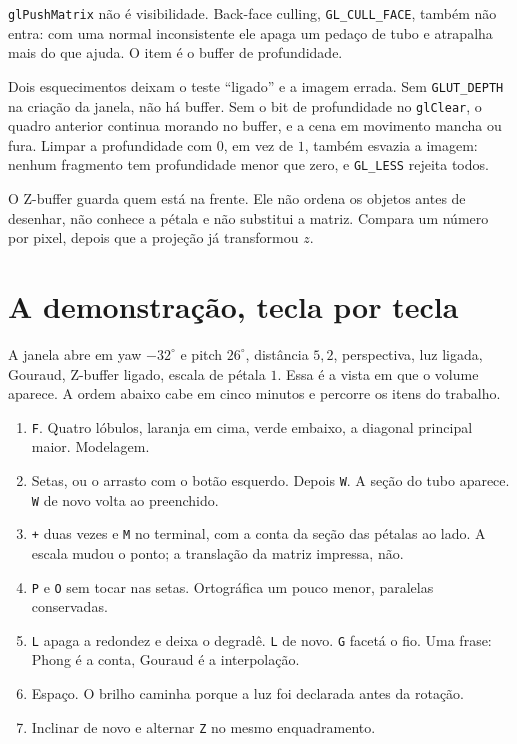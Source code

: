 \documentclass[11pt,a4paper]{article}
\newcommand{\fn}[1]{\texttt{\nobreak\hspace{0pt}#1}}
\begin{document}
\fn{glPushMatrix} não é visibilidade. Back-face culling, \fn{GL\_CULL\_FACE}, também não entra: com uma normal inconsistente ele apaga um pedaço de tubo e atrapalha mais do que ajuda. O item é o buffer de profundidade.

Dois esquecimentos deixam o teste ``ligado'' e a imagem errada. Sem \fn{GLUT\_DEPTH} na criação da janela, não há buffer. Sem o bit de profundidade no \fn{glClear}, o quadro anterior continua morando no buffer, e a cena em movimento mancha ou fura. Limpar a profundidade com \(0\), em vez de \(1\), também esvazia a imagem: nenhum fragmento tem profundidade menor que zero, e \fn{GL\_LESS} rejeita todos.

\begin{voz}
O Z-buffer guarda quem está na frente. Ele não ordena os objetos antes de desenhar, não conhece a pétala e não substitui a matriz. Compara um número por pixel, depois que a projeção já transformou \(z\).
\end{voz}

\section{A demonstração, tecla por tecla}
\label{sec:teclas}

A janela abre em yaw \(-32^\circ\) e pitch \(26^\circ\), distância \(5{,}2\), perspectiva, luz ligada, Gouraud, Z-buffer ligado, escala de pétala \(1\). Essa é a vista em que o volume aparece. A ordem abaixo cabe em cinco minutos e percorre os itens do trabalho.

\begin{enumerate}
\item \fn{F}. Quatro lóbulos, laranja em cima, verde embaixo, a diagonal principal maior. Modelagem.
\item Setas, ou o arrasto com o botão esquerdo. Depois \fn{W}. A seção do tubo aparece. \fn{W} de novo volta ao preenchido.
\item \fn{+} duas vezes e \fn{M} no terminal, com a conta da seção das pétalas ao lado. A escala mudou o ponto; a translação da matriz impressa, não.
\item \fn{P} e \fn{O} sem tocar nas setas. Ortográfica um pouco menor, paralelas conservadas.
\item \fn{L} apaga a redondez e deixa o degradê. \fn{L} de novo. \fn{G} facetá o fio. Uma frase: Phong é a conta, Gouraud é a interpolação.
\item Espaço. O brilho caminha porque a luz foi declarada antes da rotação.
\item Inclinar de novo e alternar \fn{Z} no mesmo enquadramento.
\end{enumerate}
\end{document}

